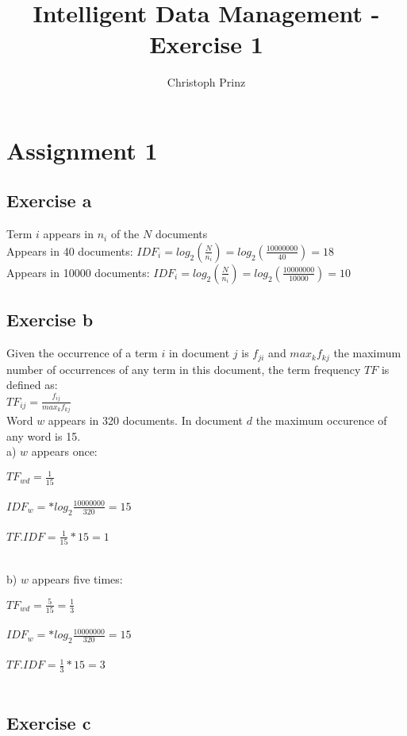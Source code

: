 \documentclass[]{scrartcl}
\title{Intelligent Data Management - Exercise 1}
\author{Christoph Prinz}
\begin{document}
\maketitle


\section*{Assignment 1}

\subsection*{Exercise a}

Term $i$ appears in $n_i$ of the $N$ documents \\

Appears in 40 documents:
$IDF_i = log_2(\frac{N}{n_i}) = log_2(\frac{10000000}{40}) = 18$\\

Appears in 10000 documents:
$IDF_i = log_2(\frac{N}{n_i}) = log_2(\frac{10000000}{10000}) = 10$ \\


\subsection*{Exercise b}

Given the occurrence of a term $i$ in document $j$ is $f_{ji}$ and $max_k f_{kj}$ the maximum number of occurrences of any term in this document, the term frequency $TF$ is defined as:\\

$TF_{ij} = \frac{f_{ij}}{max_k f_{kj}}$\\

Word $w$ appears in 320 documents. In document $d$ the maximum occurence of any word is 15. \\

a) $w$ appears once:\\
\begin{addmargin}[25pt]{0pt} 

 $TF_{wd} = \frac{1}{15}$\\\\
 $IDF_w = * log_2\frac{10000000}{320} = 15$\\\\
 $TF.IDF = \frac{1}{15} * 15 = 1$\\\\

\end{addmargin}

b) $w$ appears five times: \\
\begin{addmargin}[25pt]{0pt} 
$TF_{wd} = \frac{5}{15} = \frac{1}{3}$\\\\
$IDF_w = * log_2\frac{10000000}{320} = 15$\\\\
$TF.IDF = \frac{1}{3} * 15 = 3$\\\\
\end{addmargin}

\subsection*{Exercise c}
\end{document}
